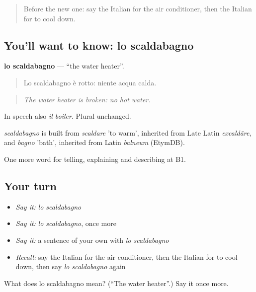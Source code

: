 \label{lesson:IT-C435-scaldabagno}



\begin{quote}
Before the new one: say the Italian for the air conditioner, then the Italian for to cool down.
\end{quote}

\subsection*{You'll want to know: lo scaldabagno}
\textbf{lo scaldabagno} — \textquotedblleft{}the water heater\textquotedblright{}.

\begin{quote}
Lo scaldabagno è rotto: niente acqua calda.
\end{quote}

\begin{quote}
\emph{The water heater is broken: no hot water.}
\end{quote}

In speech also \emph{il boiler}. Plural unchanged.

\begin{cousinweb}
\emph{scaldabagno} is built from \emph{scaldare} 'to warm', inherited from Late Latin \emph{excaldāre}, and \emph{bagno} 'bath', inherited from Latin \emph{balneum} (EtymDB).
\end{cousinweb}

\begin{grammarlens}[title={What you've built}]
One more word for telling, explaining and describing at B1.
\end{grammarlens}

\subsection*{Your turn}
\begin{itemize}
\raggedright
  \item \emph{Say it:} \emph{lo scaldabagno}
  \item \emph{Say it:} \emph{lo scaldabagno}, once more
  \item \emph{Say it:} a sentence of your own with \emph{lo scaldabagno}
  \item \emph{Recall:} say the Italian for the air conditioner, then the Italian for to cool down, then say \emph{lo scaldabagno} again
\end{itemize}

\begin{tcolorbox}[breakable,colback=teal!4,colframe=teal!35!black,title={Before you move on}]
What does lo scaldabagno mean? (\textquotedblleft{}The water heater\textquotedblright{}.) Say it once more.
\end{tcolorbox}
